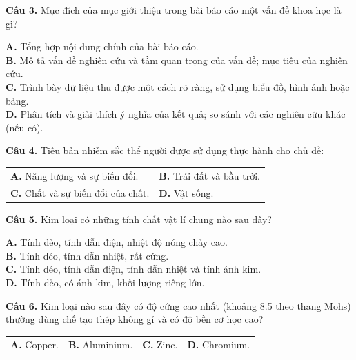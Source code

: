 \documentclass{article}
\begin{document}
\fontsize{25}{33}\selectfont
\textbf{Câu 3.} Mục đích của mục giới thiệu trong bài báo cáo một vấn đề khoa học là gì?
\vspace{6pt}

\textbf{A.} Tổng hợp nội dung chính của bài báo cáo.\\
\textbf{B.} Mô tả vấn đề nghiên cứu và tầm quan trọng của vấn đề; mục tiêu của nghiên cứu.\\
\textbf{C.} Trình bày dữ liệu thu được một cách rõ ràng, sử dụng biểu đồ, hình ảnh hoặc bảng.\\
\textbf{D.} Phân tích và giải thích ý nghĩa của kết quả; so sánh với các nghiên cứu khác (nếu có).

\vspace*{\fill}

\textbf{Câu 4.} Tiêu bản nhiễm sắc thể người được sử dụng thực hành cho chủ đề:
\vspace{6pt}

\begin{tabularx}{\linewidth}{@{}X X@{}}
\textbf{A.} Năng lượng và sự biến đổi. & \textbf{B.} Trái đất và bầu trời.\\[8pt]
\textbf{C.} Chất và sự biến đổi của chất. & \textbf{D.} Vật sống.
\end{tabularx}
\vspace*{\fill}
\newpage

\fontsize{26}{34}\selectfont
\textbf{Câu 5.} Kim loại có những tính chất vật lí chung nào sau đây?
\vspace{6pt}

\textbf{A.} Tính dẻo, tính dẫn điện, nhiệt độ nóng chảy cao.\\
\textbf{B.} Tính dẻo, tính dẫn nhiệt, rất cứng.\\
\textbf{C.} Tính dẻo, tính dẫn điện, tính dẫn nhiệt và tính ánh kim.\\
\textbf{D.} Tính dẻo, có ánh kim, khối lượng riêng lớn.

\vspace*{\fill}

\textbf{Câu 6.} Kim loại nào sau đây có độ cứng cao nhất (khoảng 8.5 theo thang Mohs) thường dùng chế tạo thép không gỉ và có độ bền cơ học cao?
\vspace{6pt}

\begin{tabularx}{\linewidth}{@{}X X X X@{}}
\textbf{A.} Copper. & \textbf{B.} Aluminium. & \textbf{C.} Zinc. & \textbf{D.} Chromium.
\end{tabularx}
\vspace*{\fill}
\newpage
\end{document}
